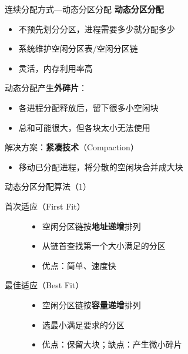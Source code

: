 \documentclass[10pt, aspectratio=169]{beamer}
\begin{document}
\begin{frame}{连续分配方式---动态分区分配}
    \textbf{动态分区分配}
    \begin{itemize}
        \item 不预先划分分区，进程需要多少就分配多少
        \item 系统维护空闲分区表/空闲分区链
        \item 灵活，内存利用率高
    \end{itemize}
    \vspace{0.5em}
    动态分配产生\textbf{外碎片}：
    \begin{itemize}
        \item 各进程分配释放后，留下很多小空闲块
        \item 总和可能很大，但各块太小无法使用
    \end{itemize}
    解决方案：\textbf{紧凑技术}（Compaction）
    \begin{itemize}
        \item 移动已分配进程，将分散的空闲块合并成大块
    \end{itemize}
\end{frame}

\begin{frame}{动态分区分配算法（1）}
    \begin{description}
        \item[首次适应（First Fit）]
            \begin{itemize}
                \item 空闲分区链按\textbf{地址递增}排列
                \item 从链首查找第一个大小满足的分区
                \item 优点：简单、速度快
            \end{itemize}
        \item[最佳适应（Best Fit）]
            \begin{itemize}
                \item 空闲分区链按\textbf{容量递增}排列
                \item 选最小满足要求的分区
                \item 优点：保留大块；缺点：产生微小碎片
            \end{itemize}
    \end{description}
\end{frame}
\end{document}

